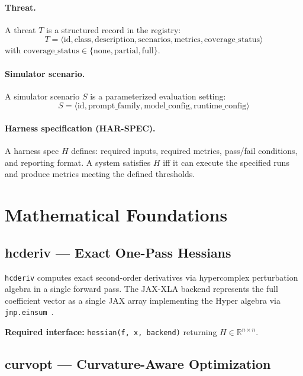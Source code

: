 \documentclass[11pt]{article}
\begin{document}
\paragraph{Threat.}
A threat $T$ is a structured record in the registry:
\[
T = \langle \mathrm{id}, \mathrm{class}, \mathrm{description}, \mathrm{scenarios},
            \mathrm{metrics}, \mathrm{coverage\_status} \rangle
\]
with $\mathrm{coverage\_status} \in \{\mathrm{none}, \mathrm{partial}, \mathrm{full}\}$.

\paragraph{Simulator scenario.}
A simulator scenario $S$ is a parameterized evaluation setting:
\[
S = \langle \mathrm{id}, \mathrm{prompt\_family}, \mathrm{model\_config},
            \mathrm{runtime\_config} \rangle
\]

\paragraph{Harness specification (HAR-SPEC).}
A harness spec $H$ defines: required inputs, required metrics, pass/fail conditions, and
reporting format. A system satisfies $H$ iff it can execute the specified runs and produce
metrics meeting the defined thresholds.


\section{Mathematical Foundations}

\subsection{hcderiv --- Exact One-Pass Hessians}

\texttt{hcderiv} computes exact second-order derivatives via hypercomplex perturbation algebra
in a single forward pass. The JAX-XLA backend represents the full coefficient vector as a
single JAX array implementing the Hyper algebra via \texttt{jnp.einsum}~\cite{byte2026hcderiv}.

\noindent \textbf{Required interface:}
\texttt{hessian(f, x, backend)} returning $H \in \mathbb{R}^{n \times n}$.

\subsection{curvopt --- Curvature-Aware Optimization}
\end{document}
